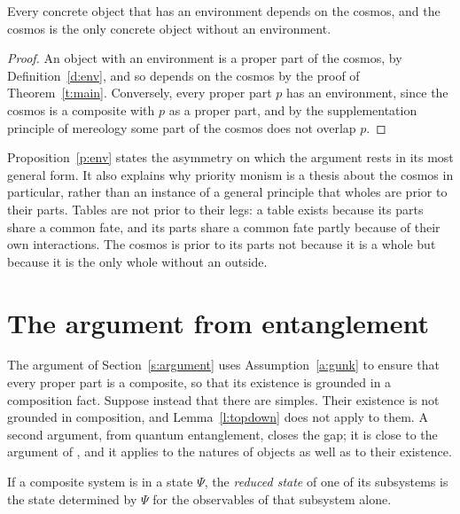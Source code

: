 \documentclass{situationist-preprint}
\begin{document}
\begin{proposition}\label{p:env}
Every concrete object that has an environment depends on the cosmos, and the cosmos is the only concrete object without an environment.
\end{proposition}

\begin{proof}
An object with an environment is a proper part of the cosmos, by Definition~\ref{d:env}, and so depends on the cosmos by the proof of Theorem~\ref{t:main}. Conversely, every proper part $p$ has an environment, since the cosmos is a composite with $p$ as a proper part, and by the supplementation principle of mereology some part of the cosmos does not overlap $p$.
\end{proof}

Proposition~\ref{p:env} states the asymmetry on which the argument rests in its most general form. It also explains why priority monism is a thesis about the cosmos in particular, rather than an instance of a general principle that wholes are prior to their parts. Tables are not prior to their legs: a table exists because its parts share a common fate, and its parts share a common fate partly because of their own interactions. The cosmos is prior to its parts not because it is a whole but because it is the only whole without an outside.

\section{The argument from entanglement}\label{s:entanglement}

The argument of Section~\ref{s:argument} uses Assumption~\ref{a:gunk} to ensure that every proper part is a composite, so that its existence is grounded in a composition fact. Suppose instead that there are simples. Their existence is not grounded in composition, and Lemma~\ref{l:topdown} does not apply to them. A second argument, from quantum entanglement, closes the gap; it is close to the argument of \citet{Schaffer2010}, and it applies to the natures of objects as well as to their existence.

\begin{definition}\label{d:reduced}
If a composite system is in a state $\Psi$, the \emph{reduced state} of one of its subsystems is the state determined by $\Psi$ for the observables of that subsystem alone.
\end{definition}
\end{document}
